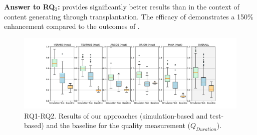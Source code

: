 \textbf{Answer to RQ$_2$:} \simhotep{} provides significantly better results than \timhotep{} in the context of content generating through transplantation. The efficacy of \simhotep{} demonstrates a 150\% enhancement compared to the outcomes of \timhotep{}.

\begin{figure}[tb]
    \centering
    \includegraphics[width=\textwidth]{Figures/Imhotep_with_legend_and_oracle_average-v4.pdf}
    \caption{RQ1-RQ2. Results of our \ApproachName{} approaches (simulation-based and test-based) and the baseline for the quality measurement ($Q_{Duration}$).}
    \label{fig:results}
\end{figure}